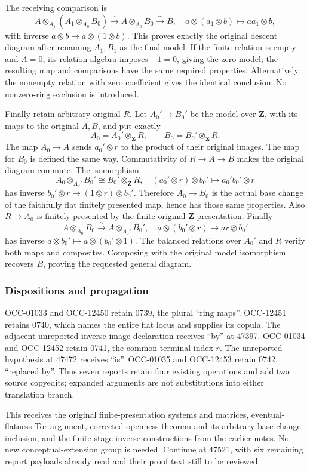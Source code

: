 The receiving comparison is \[
 A\otimes_{A_1}(A_1\otimes_{A_0}B_0)
   \xrightarrow{\sim} A\otimes_{A_0}B_0\xrightarrow{\sim}B,
 \quad a\otimes(a_1\otimes b)\longmapsto aa_1\otimes b,
\] with inverse \(a\otimes b\mapsto a\otimes(1\otimes b)\). This proves exactly the original descent diagram after renaming \(A_1,B_1\) as the final model. If the finite relation is empty and \(A=0\), its relation algebra imposes \(-1=0\), giving the zero model; the resulting map and comparisons have the same required properties. Alternatively the nonempty relation with zero coefficient gives the identical conclusion. No nonzero-ring exclusion is introduced.

Finally retain arbitrary original \(R\). Let \(A_0'\to B_0'\) be the model over \(\mathbf Z\), with its maps to the original \(A,B\), and put exactly \[
 A_0=A_0'\otimes_{\mathbf Z}R,\qquad
 B_0=B_0'\otimes_{\mathbf Z}R.
\] The map \(A_0\to A\) sends \(a_0'\otimes r\) to the product of their original images. The map for \(B_0\) is defined the same way. Commutativity of \(R\to A\to B\) makes the original diagram commute. The isomorphism \[
 A_0\otimes_{A_0'}B_0'\cong B_0'\otimes_{\mathbf Z}R,
 \quad(a_0'\otimes r)\otimes b_0'\longmapsto a_0'b_0'\otimes r
\] has inverse \(b_0'\otimes r\mapsto(1\otimes r)\otimes b_0'\). Therefore \(A_0\to B_0\) is the actual base change of the faithfully flat finitely presented map, hence has those same properties. Also \(R\to A_0\) is finitely presented by the finite original \(\mathbf Z\)-presentation. Finally \[
 A\otimes_{A_0}B_0\xrightarrow{\sim}A\otimes_{A_0'}B_0',
 \quad a\otimes(b_0'\otimes r)\longmapsto ar\otimes b_0'
\] has inverse \(a\otimes b_0'\mapsto a\otimes(b_0'\otimes1)\). The balanced relations over \(A_0'\) and \(R\) verify both maps and composites. Composing with the original model isomorphism recovers \(B\), proving the requested general diagram.

\subsubsection{Dispositions and propagation}\label{dispositions-and-propagation}

OCC-01033 and OCC-12450 retain 0739, the plural ``ring maps''. OCC-12451 retains 0740, which names the entire flat locus and supplies its copula. The adjacent unreported inverse-image declaration receives ``by'' at 47397. OCC-01034 and OCC-12452 retain 0741, the common terminal index \(r\). The unreported hypothesis at 47472 receives ``is''. OCC-01035 and OCC-12453 retain 0742, ``replaced by''. Thus seven reports retain four existing operations and add two source copyedits; expanded arguments are not substitutions into either translation branch.

This receives the original finite-presentation systems and matrices, eventual-flatness Tor argument, corrected openness theorem and its arbitrary-base-change inclusion, and the finite-stage inverse constructions from the earlier notes. No new conceptual-extension group is needed. Continue at 47521, with six remaining report payloads already read and their proof text still to be reviewed.
